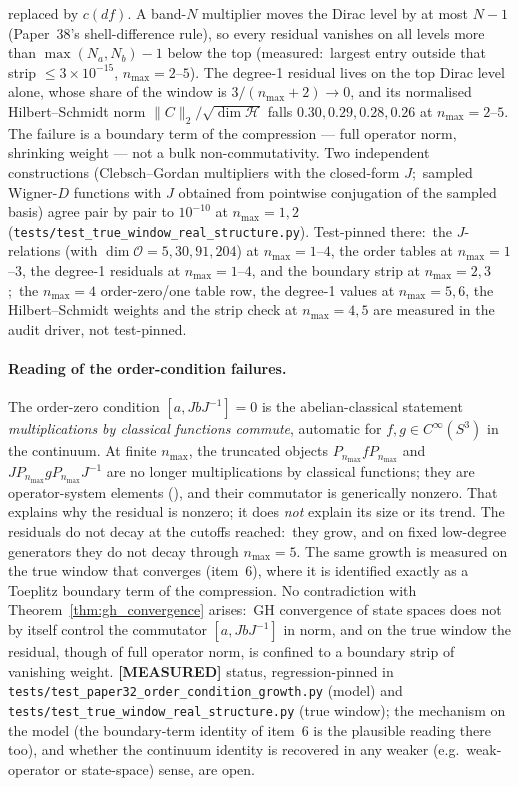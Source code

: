 \documentclass[11pt]{article}
\begin{document}
\begin{enumerate}
replaced by $c(df)$.  A band-$N$ multiplier moves the Dirac level by
at most $N - 1$ (Paper~38's shell-difference rule), so every residual
vanishes on all levels more than $\max(N_a, N_b) - 1$ below the top
(measured:\ largest entry outside that strip $\le 3 \times 10^{-15}$,
$n_{\max} = 2$--$5$).  The degree-1 residual lives on the top Dirac
level alone, whose share of the window is $3/(n_{\max} + 2) \to 0$, and
its normalised Hilbert--Schmidt norm $\|C\|_2/\sqrt{\dim\mathcal{H}}$
falls $0.30, 0.29, 0.28, 0.26$ at $n_{\max} = 2$--$5$.  The failure is
a boundary term of the compression --- full operator norm, shrinking
weight --- not a bulk non-commutativity.  Two independent constructions
(Clebsch--Gordan multipliers with the closed-form $J$;\ sampled Wigner-$D$
functions with $J$ obtained from pointwise conjugation of the sampled
basis) agree pair by pair to $10^{-10}$ at $n_{\max} = 1, 2$
(\texttt{tests/test\_true\_window\_real\_structure.py}).  Test-pinned
there:\ the $J$-relations (with $\dim\mathcal{O} = 5, 30, 91, 204$) at
$n_{\max} = 1$--$4$, the order tables at $n_{\max} = 1$--$3$,
the degree-1 residuals at $n_{\max} = 1$--$4$, and the boundary strip at
$n_{\max} = 2, 3$;\ the $n_{\max} = 4$ order-zero/one table row,
the degree-1 values at $n_{\max} = 5, 6$, the Hilbert--Schmidt weights
and the strip check at $n_{\max} = 4, 5$ are measured in the audit
driver, not test-pinned.
\end{enumerate}

\paragraph{Reading of the order-condition failures.}  The
order-zero condition $[a, J b J^{-1}] = 0$ is the
abelian-classical statement \emph{multiplications by classical
functions commute}, automatic for $f, g \in C^\infty(S^3)$ in the
continuum.  At finite $n_{\max}$, the truncated objects
$P_{n_{\max}} f P_{n_{\max}}$ and
$J P_{n_{\max}} g P_{n_{\max}} J^{-1}$ are no longer multiplications
by classical functions; they are operator-system elements
(\cite[Sec.~2]{connes_vs2021}), and their commutator is
generically nonzero.  That explains why the residual is nonzero; it
does \emph{not} explain its size or its trend.  The residuals do not
decay at the cutoffs reached:\ they grow, and on fixed low-degree
generators they do not decay through $n_{\max} = 5$.  The same growth is measured on
the true window that converges (item~6), where it is identified
exactly as a Toeplitz boundary term of the compression.  No
contradiction with Theorem~\ref{thm:gh_convergence} arises:\ GH
convergence of state spaces does not by itself control the commutator
$[a, JbJ^{-1}]$ in norm, and on the true window the residual, though of
full operator norm, is confined to a boundary strip of vanishing
weight.  \textbf{[MEASURED]} status, regression-pinned in
\texttt{tests/test\_paper32\_order\_condition\_growth.py} (model) and
\texttt{tests/test\_true\_window\_real\_structure.py} (true window);
the mechanism on the model (the boundary-term identity of item~6 is
the plausible reading there too), and whether the continuum identity
is recovered in any weaker (e.g.\ weak-operator or state-space) sense,
are open.
\end{document}
